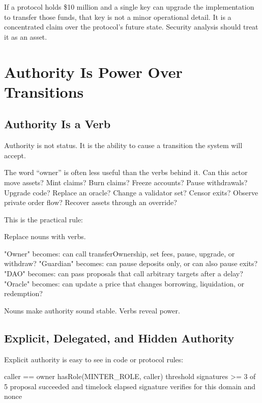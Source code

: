 If a protocol holds \$10 million and a single key can upgrade the implementation to transfer those funds, that key is not a minor operational detail. It is a concentrated claim over the protocol's future state. Security analysis should treat it as an asset.

\section{Authority Is Power Over Transitions}

\subsection{Authority Is a Verb}

Authority is not status. It is the ability to cause a transition the system will accept.

The word ``owner'' is often less useful than the verbs behind it. Can this actor move assets? Mint claims? Burn claims? Freeze accounts? Pause withdrawals? Upgrade code? Replace an oracle? Change a validator set? Censor exits? Observe private order flow? Recover assets through an override?

This is the practical rule:

\begin{codeblock}
Replace nouns with verbs.

"Owner" becomes: can call transferOwnership, set fees, pause, upgrade, or withdraw?
"Guardian" becomes: can pause deposits only, or can also pause exits?
"DAO" becomes: can pass proposals that call arbitrary targets after a delay?
"Oracle" becomes: can update a price that changes borrowing, liquidation, or redemption?
\end{codeblock}

Nouns make authority sound stable. Verbs reveal power.

\subsection{Explicit, Delegated, and Hidden Authority}

Explicit authority is easy to see in code or protocol rules:

\begin{codeblock}
caller == owner
hasRole(MINTER_ROLE, caller)
threshold signatures >= 3 of 5
proposal succeeded and timelock elapsed
signature verifies for this domain and nonce
\end{codeblock}

